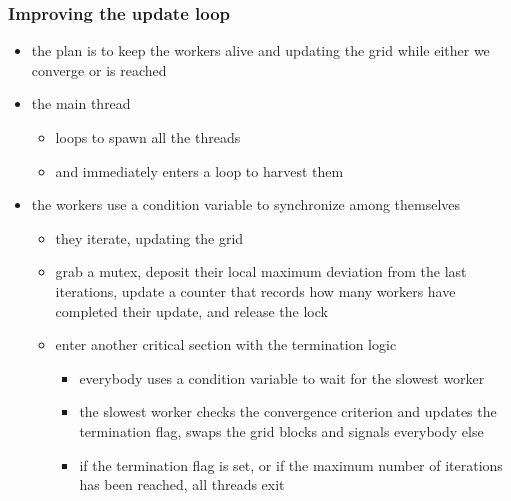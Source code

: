 \begin{frame}[fragile]
%
  \frametitle{Improving the update loop}
%
  \begin{itemize}
%
  \item the plan is to keep the workers alive and updating the grid while either we converge or
     is reached
  \item the main thread
    \begin{itemize}
    \item loops to spawn all the threads
    \item and immediately enters a loop to harvest them
    \end{itemize}
%
  \item the workers use a condition variable to synchronize among themselves
    \begin{itemize}
    \item they iterate, updating the grid
    \item grab a mutex, deposit their local maximum deviation from the last iterations, update
      a counter that records how many workers have completed their update, and release the lock
    \item enter another critical section with the termination logic
      \begin{itemize}
      \item everybody uses a condition variable to wait for the slowest worker
      \item the slowest worker checks the convergence criterion and updates the termination
        flag, swaps the grid blocks and signals everybody else
      \item if the termination flag is set, or if the maximum number of iterations has been
        reached, all threads exit
      \end{itemize}
    \end{itemize}
%
  \end{itemize}
%
\end{frame}

